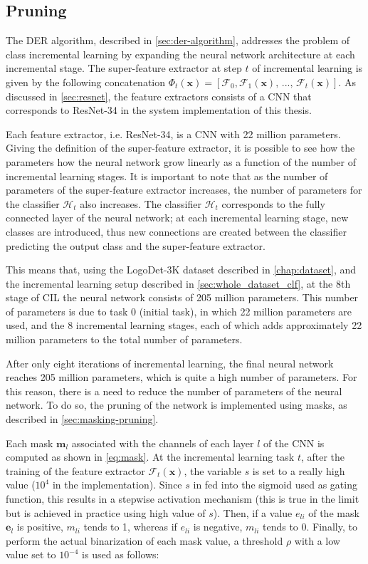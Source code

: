 \subsection{Pruning}
\label{sec:method-pruning}

The DER algorithm, described in \autoref{sec:der-algorithm}, addresses the problem of class incremental learning by expanding the neural network architecture at each incremental stage. The super-feature extractor at step $t$ of incremental learning is given by the following concatenation $\Phi_t(\mathbf{x}) = [\mathcal{F}_0,\mathcal{F}_1(\mathbf{x}), \, ..., \, \mathcal{F}_t(\mathbf{x})]$. As discussed in \autoref{sec:resnet}, the feature extractors consists of a CNN that corresponds to ResNet-34 in the system implementation of this thesis.

Each feature extractor, i.e. ResNet-34, is a CNN with 22 million parameters. Giving the definition of the super-feature extractor, it is possible to see how the parameters how the neural network grow linearly as a function of the number of incremental learning stages. It is important to note that as the number of parameters of the super-feature extractor increases, the number of parameters for the classifier $\mathcal{H}_t$ also increases.
The classifier $\mathcal{H}_t$ corresponds to the fully connected layer of the neural network; at each incremental learning stage, new classes are introduced, thus new connections are created between the classifier predicting the output class and the super-feature extractor.

This means that, using the LogoDet-3K dataset described in \autoref{chap:dataset}, and the incremental learning setup described in \autoref{sec:whole_dataset_clf}, at the 8th stage of CIL the neural network consists of 205 million parameters. This number of parameters is due to task 0 (initial task), in which 22 million parameters are used, and the 8 incremental learning stages, each of which adds approximately 22 million parameters to the total number of parameters.

After only eight iterations of incremental learning, the final neural network reaches 205 million parameters, which is quite a high number of parameters. 
For this reason, there is a need to reduce the number of parameters of the neural network.
To do so, the pruning of the network is implemented using masks, as described in \autoref{sec:masking-pruning}.

Each mask $\mathbf{m}_l$ associated with the channels of each layer $l$ of the CNN is computed as shown in \autoref{eq:mask}.
At the incremental learning task $t$, after the training of the feature extractor $\mathcal{F}_t(\mathbf{x})$, the variable $s$ is set to a really high value ($10^{4}$ in the implementation). Since $s$ in fed into the sigmoid used as gating function, this results in a stepwise activation mechanism (this is true in the limit but is achieved in practice using high value of $s$). Then, if a value $e_{li}$ of the mask $\mathbf{e}_l$ is positive, $m_{li}$ tends to 1, whereas if $e_{li}$ is negative, $m_{li}$ tends to 0. Finally, to perform the actual binarization of each mask value, a threshold $\rho$ with a low value set to $10^{-4}$ is used as follows:


